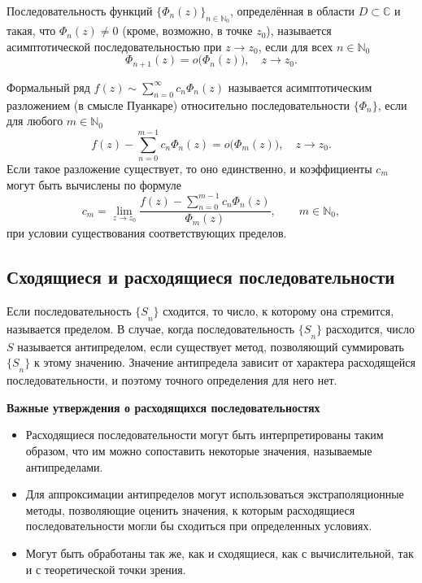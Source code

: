 \documentclass[14pt, a4paper]{extarticle}
\theoremstyle{definition}
\theoremstyle{remark}
\begin{document}
Последовательность функций \(\{\Phi_n(z)\}_{n\in\mathbb{N}_0}\), определённая в области \(D\subset\mathbb{C}\) и такая, что \(\Phi_n(z)\neq 0\) (кроме, возможно, в точке \(z_0\)), называется асимптотической последовательностью при \(z\to z_0\), если для всех \(n\in\mathbb{N}_0\)
\[
\Phi_{n+1}(z)=o\bigl(\Phi_n(z)\bigr),\quad z\to z_0.
\]

Формальный ряд \(f(z)\sim\sum_{n=0}^{\infty} c_n \Phi_n(z)\) называется асимптотическим разложением (в смысле Пуанкаре) относительно последовательности \(\{\Phi_n\}\), если для любого \(m\in\mathbb{N}_0\)
\[
f(z)-\sum_{n=0}^{m-1} c_n\Phi_n(z)=o\bigl(\Phi_m(z)\bigr),\quad z\to z_0.
\]
Если такое разложение существует, то оно единственно, и коэффициенты \(c_m\) могут быть вычислены по формуле
\[
c_m=\lim_{z\to z_0}\frac{f(z)-\sum_{n=0}^{m-1} c_n\Phi_n(z)}{\Phi_m(z)},\qquad m\in\mathbb{N}_0,
\]
при условии существования соответствующих пределов.

\subsection*{Сходящиеся и расходящиеся последовательности}

Если последовательность \({\{ S}_{n}\}\) сходится, то число, к которому
она стремится, называется пределом. В случае, когда последовательность
\({\{ S}_{n}\}\) расходится, число \(S\) называется антипределом, если
существует метод, позволяющий суммировать \({\{ S}_{n}\}\) к этому
значению. Значение антипредела зависит от характера расходящейся
последовательности, и поэтому точного определения для него нет.




\textbf{Важные утверждения о расходящихся последовательностях}

\begin{itemize}
\item
  Расходящиеся последовательности могут быть интерпретированы таким
  образом, что им можно сопоставить некоторые значения, называемые
  антипределами.
\item
  Для аппроксимации антипределов могут использоваться экстраполяционные
  методы, позволяющие оценить значения, к которым расходящиеся
  последовательности могли бы сходиться при определенных условиях.
\item
  Могут быть обработаны так же, как и сходящиеся, как с вычислительной,
  так и с теоретической точки зрения.
\end{itemize}
\end{document}
